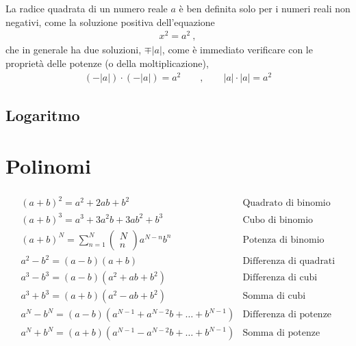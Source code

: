 \documentclass[letterpaper,10pt,italian]{jupyterBook}
\begin{document}
\sphinxAtStartPar
La radice quadrata di un numero reale \(a\) è ben definita solo per i numeri reali non negativi, come la soluzione positiva dell’equazione
\begin{equation*}
\begin{split}x^2 = a^2 \ ,\end{split}
\end{equation*}
\sphinxAtStartPar
che in generale ha due soluzioni, \(\mp |a|\), come è immediato verificare con le proprietà delle potenze (o della moltiplicazione),
\begin{equation*}
\begin{split}
(-|a|) \cdot (-|a|) = a^2 \qquad , \qquad
  |a|  \cdot   |a|  = a^2
\end{split}
\end{equation*}
\sphinxAtStartPar
{}


\subsection{Logaritmo}
\label{\detokenize{ch/algebra/real-algebra:logaritmo}}
\sphinxAtStartPar
{}

\sphinxAtStartPar
{}


\section{Polinomi}
\label{\detokenize{ch/algebra/real-algebra:polinomi}}
\sphinxAtStartPar
{}
\begin{equation*}
\begin{split}\begin{aligned}
 & (a+b)^2 = a^2 + 2ab + b^2                           & \text{Quadrato di binomio} \\
 & (a+b)^3 = a^3 + 3a^2 b + 3 a b^2 + b^3              & \text{Cubo di binomio} \\
 & (a+b)^N = \sum_{n=1}^{N} \left( \begin{matrix} N \\ n \end{matrix} \right) a^{N-n} b^n
 & \text{Potenza di binomio} \\
 & a^2 - b^2 = (a-b)(a+b)                              & \text{Differenza di quadrati} \\
 & a^3 - b^3 = (a-b)(a^2+ab+b^2)                       & \text{Differenza di cubi} \\
 & a^3 + b^3 = (a+b)(a^2-ab+b^2)                       & \text{Somma di cubi} \\
 & a^N - b^N = (a-b)(a^{N-1}+a^{N-2}b+\dots+b^{N-1})   & \text{Differenza di potenze} \\
 & a^N + b^N = (a+b)(a^{N-1}-a^{N-2}b+\dots+b^{N-1})   & \text{Somma di potenze dispari} \\
\end{aligned}\end{split}
\end{equation*}
\sphinxAtStartPar
{} 
\end{document}
